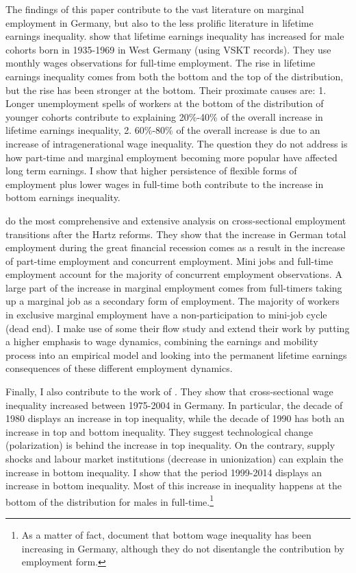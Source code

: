 \documentclass[12pt, a4paper]{article}
\begin{document}
The findings of this paper contribute to the vast literature on marginal employment in Germany, but also to the less prolific literature in lifetime earnings inequality. \cite{BoCo15} show that lifetime earnings inequality has increased for male cohorts born in 1935-1969 in West Germany (using VSKT records). They use monthly wages observations for full-time employment. The rise in lifetime earnings inequality comes from both the bottom and the top of the distribution, but the rise has been stronger at the bottom. Their proximate causes are: 1. Longer unemployment spells of workers at the bottom of the distribution of younger cohorts contribute to explaining 20\%-40\% of the overall increase in lifetime
earnings inequality, 2. 60\%-80\% of the overall increase is due to an increase of
intragenerational wage inequality. The question they do not address is how part-time and marginal employment becoming more popular have affected long term earnings. I show that higher persistence of flexible forms of employment plus lower wages in full-time both contribute to the increase in bottom earnings inequality. 

\cite{CaLaRo18} do the most comprehensive and extensive analysis on cross-sectional employment transitions after the Hartz reforms. They show that the increase in German total employment during the great financial recession comes as a result in the increase of part-time employment and concurrent employment. Mini jobs and full-time employment account for the majority of concurrent employment observations. A large part of the increase in marginal employment comes from full-timers taking up a marginal job as a secondary form of employment. The majority of workers in exclusive marginal employment have a non-participation to mini-job cycle (dead end). I make use of some their flow study and extend their work by putting a higher emphasis to wage dynamics, combining the earnings and mobility process into an empirical model and looking into the permanent lifetime earnings consequences of these different employment dynamics.

Finally, I also contribute to the work of \cite{DuLuSc09}. They show that cross-sectional wage inequality increased between 1975-2004 in Germany. In particular, the decade of 1980 displays an increase in top inequality, while the decade of 1990 has both an increase in top and bottom inequality. They suggest technological change (polarization) is behind the increase in top inequality. On the contrary, supply shocks and labour market institutions (decrease in unionization) can explain the increase in bottom inequality. I show that the period 1999-2014 displays an increase in bottom inequality. Most of this increase in inequality happens at the bottom of the distribution for males in full-time.\footnote{As a matter of fact, \cite{DuSpOe14} document that bottom wage inequality has been increasing in Germany, although they do not disentangle the contribution by employment form.}
\end{document}
